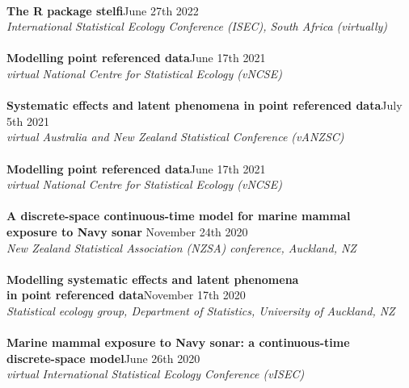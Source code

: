 \documentclass[10pt,letter]{article}
\begin{document}
                 \hdashrule[0.5ex]{4cm}{1pt}{1pt}\\
                 {\textbf{The R package stelfi}}\hfill June 27th 2022\\
                 {\sl  International Statistical Ecology Conference (ISEC), South Africa (virtually)}\\
                 \hdashrule[0.5ex]{4cm}{1pt}{1pt}\\
                  {\textbf{Modelling point referenced data}}\hfill June 17th 2021\\
                 {\sl virtual National Centre for Statistical Ecology (vNCSE)}\\
                 \hdashrule[0.5ex]{4cm}{1pt}{1pt}\\
 {\textbf{Systematic effects and latent phenomena in point referenced data}}\hfill July 5th 2021\\
                 {\sl virtual Australia and New Zealand Statistical Conference (vANZSC)}\\
                 \hdashrule[0.5ex]{4cm}{1pt}{1pt}\\
                  {\textbf{Modelling point referenced data}}\hfill June 17th 2021\\
                 {\sl virtual National Centre for Statistical Ecology (vNCSE)}\\
                 \hdashrule[0.5ex]{4cm}{1pt}{1pt}\\
{\textbf{A discrete-space continuous-time model for marine mammal \\
           exposure to Navy sonar }}\hfill November 24th 2020\\
       {\sl New Zealand Statistical Association (NZSA) conference, Auckland, NZ}\\
       \hdashrule[0.5ex]{4cm}{1pt}{1pt}\\
{\textbf{Modelling systematic effects and latent phenomena \\
                     in point referenced data}}\hfill November 17th 2020\\
                 {\sl Statistical ecology group, Department of Statistics, University of Auckland, NZ}\\
                 \hdashrule[0.5ex]{4cm}{1pt}{1pt}\\
{\textbf{Marine mammal exposure to Navy sonar: a continuous-time \\
                     discrete-space model}}\hfill June 26th 2020\\
                 {\sl virtual International Statistical Ecology Conference (vISEC)}\\
\end{document}
